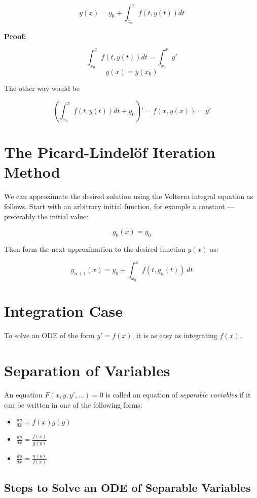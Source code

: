 \[
    y(x) = y_0 + \int_{x_0}^{x} f(t, y(t))dt
\]

\textbf{Proof:}

\[
    \int_{x_0}^{x} f(t, y(t))dt = \int_{x_0}^{x} y'
\]
\[
    y(x) = y(x_0)
\]

The other way would be

\[
    \left(\int_{x_0}^{x} f(t, y(t))dt + y_0\right)' = f(x, y(x)) = y'
\]

\QED

\section{The Picard-Lindelöf Iteration Method}

We can approximate the desired solution using the Volterra integral equation as follows.
Start with an arbitrary initial function, for example a constant — preferably the initial value:

\[
    g_0(x) = y_0
\]

Then form the next approximation to the desired function \( y(x) \) as:

\[
    g_{n+1}(x) = y_0 + \int_{x_0}^{x} f(t, g_n(t)) \, dt
\]

\section{Integration Case}

To solve an ODE of the form \(y' = f(x)\), it is as easy as integrating \(f(x)\).

\section{Separation of Variables}

An equation \(F(x,y,y',\dots) = 0\) is called an equation of \emph{separable variables} if it can
be written in one of the following forms:

\begin{itemize}

    \item \(\frac{dy}{dx} = f(x) g(y)\)

    \item \(\frac{dy}{dx} = \frac{f(x)}{g(y)}\)

    \item \(\frac{dy}{dx} = \frac{g(y)}{f(x)}\)

\end{itemize}

\subsection{Steps to Solve an ODE of Separable Variables}

